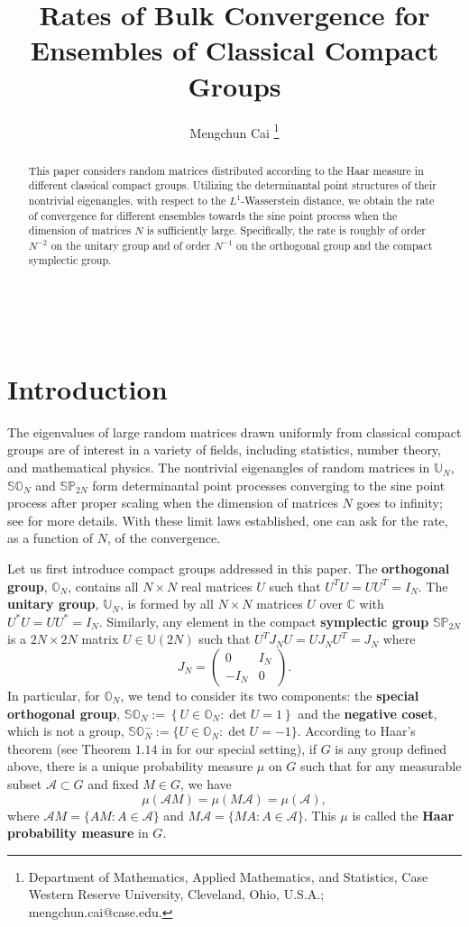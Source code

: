 \documentclass[11pt]{article}
\title{Rates of Bulk Convergence for Ensembles of Classical Compact Groups}
\author{Mengchun Cai%
\thanks{Department of Mathematics, Applied Mathematics, and
  Statistics, Case Western Reserve University, Cleveland, Ohio,
  U.S.A.; mengchun.cai@case.edu.}}
\date{}
\numberwithin{equation}{section}%
\numberwithin{theorem}{section}
\begin{document}
\maketitle
\begin{abstract}
This paper considers random matrices distributed according to the Haar measure in different classical compact groups. Utilizing the determinantal point structures of their nontrivial eigenangles, with respect to the $L^1$-Wasserstein distance, we obtain the rate of convergence for different ensembles towards the sine point process when the dimension of matrices $N$ is sufficiently large. Specifically, the rate is roughly of order $N^{-2}$ on the unitary group and of order $N^{-1}$ on the orthogonal group and the compact symplectic group.
\end{abstract}
\
\section{Introduction}
The eigenvalues of large random matrices drawn uniformly from classical compact groups are of interest in a variety of fields, including statistics, number theory, and mathematical physics. The nontrivial eigenangles of random matrices in $\mathbb{U}_N$, $\mathbb{SO}_N$ and $\mathbb{SP}_{2N}$  form  determinantal point processes converging to the sine point process after proper scaling when the dimension of matrices $N$ goes to infinity; see \cite{meckes_random_2019} for more details. With these limit laws established, one can ask for the rate, as a function of $N$, of the convergence.

Let us first introduce compact groups addressed in this paper. The {\bf orthogonal group}, $\mathbb{O}_N$, contains all $N\times N$ real matrices $U$ such that $U^TU=UU^T=I_N$. The {\bf unitary group}, $\mathbb{U}_N$, is formed by all $N\times N$ matrices $U$ over $\mathbb{C}$ with $U^*U=UU^*=I_N$. Similarly, any element in the compact {\bf symplectic group} $\mathbb{SP}_{2N}$ is a $2N\times 2N$ matrix $U\in\mathbb{U}(2N)$ such that $U^TJ_{N}U=UJ_NU^T=J_N$ where
\begin{equation*}
   J_N=\left( \begin{matrix}
        0&I_N\\
        -I_N&0
    \end{matrix}\right).
\end{equation*}
In particular, for $\mathbb{O}_N$, we tend to consider its two components: the {\bf special orthogonal group}, $\mathbb{SO}_N:=\left\{U\in\mathbb{O}_N:\det U=1\right\}$ and the {\bf negative coset}, which is not a group, $\mathbb{SO}^{-}_N:=\{U\in\mathbb{O}_N:\det U=-1\}$. According to Haar's theorem (see Theorem $1.14$ in \cite{meckes_random_2019} for our special setting), if $G$ is any group defined above, there is a unique probability measure $\mu$ on $G$ such that for any measurable subset $\mathcal{A}\subset G$ and fixed $M\in G$, we have
\begin{equation*}
    \mu\left(\mathcal{A}M\right)=\mu\left(M\mathcal{A}\right)=\mu(\mathcal{A}),
\end{equation*}
where $\mathcal{A}M=\{AM:A\in\mathcal{A}\}$ and $M\mathcal{A}=\{MA:A\in\mathcal{A}\}$. This $\mu$ is called the {\bf Haar probability measure} in $G$.
\end{document}
